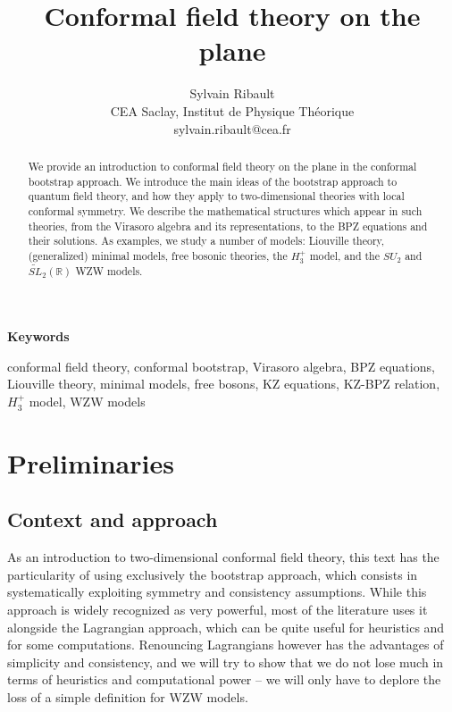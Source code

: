 \documentclass[12pt,a4paper,notitlepage]{report}
\title{\bfseries Conformal field theory on the plane}
\author{Sylvain Ribault \vspace{2mm}
\\
{\normalsize CEA Saclay, Institut de Physique Th\'eorique}
 \\
 {\footnotesize \ttfamily sylvain.ribault@cea.fr }
}
\numberwithin{equation}{section}
\theoremstyle{break}
\begin{document}
\maketitle

\begin{abstract}
We provide an introduction to conformal field theory on the plane in the conformal bootstrap approach. We introduce the main ideas of the bootstrap approach to quantum field theory, and how they apply to two-dimensional theories with local conformal symmetry. We describe the mathematical structures which appear in such theories, from the Virasoro algebra and its representations, to the BPZ equations and their solutions. As examples, we study a number of models: Liouville theory, (generalized) minimal models, free bosonic theories, the $H_3^+$ model, and the $SU_2$ and $\widetilde{SL}_2(\mathbb{R})$ WZW models. 
\end{abstract}
\vspace{1cm}
\begin{center}
 \textbf{Keywords}
\end{center}
\noindent conformal field theory, conformal bootstrap, Virasoro algebra, BPZ equations, Liouville theory, minimal models, free bosons,
KZ equations, KZ-BPZ relation, $H_3^+$ model, WZW models


\tableofcontents
\hypersetup{linkcolor=blue}

\addtocounter{chapter}{-1}

\chapter{Preliminaries \label{secprel}}

\section{Context and approach}

As an introduction to two-dimensional conformal field theory, this text has the particularity of using exclusively the bootstrap approach, which consists in systematically exploiting symmetry and consistency assumptions. While this approach is widely recognized as very powerful, most of the literature uses it alongside the Lagrangian approach, which can be quite useful for heuristics and for some computations. Renouncing Lagrangians however has the advantages of simplicity and consistency, and we will try to show that we do not lose much in terms of heuristics and computational power -- we will only have to deplore the loss of a simple definition for WZW models.
\end{document}
